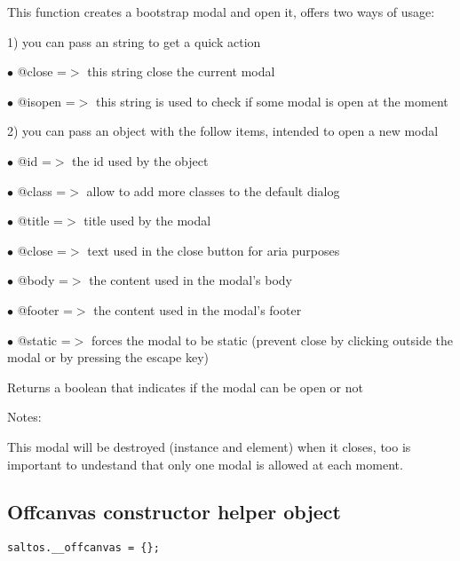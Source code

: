\documentclass[a4paper]{book}
\begin{document}
This function creates a bootstrap modal and open it, offers two ways of usage:

1) you can pass an string to get a quick action

\begin{compactitem}
\item[\color{myblue}$\bullet$] @close  =$>$ this string close the current modal
\item[\color{myblue}$\bullet$] @isopen =$>$ this string is used to check if some modal is open at the moment
\end{compactitem}

2) you can pass an object with the follow items, intended to open a new modal

\begin{compactitem}
\item[\color{myblue}$\bullet$] @id     =$>$ the id used by the object
\item[\color{myblue}$\bullet$] @class  =$>$ allow to add more classes to the default dialog
\item[\color{myblue}$\bullet$] @title  =$>$ title used by the modal
\item[\color{myblue}$\bullet$] @close  =$>$ text used in the close button for aria purposes
\item[\color{myblue}$\bullet$] @body   =$>$ the content used in the modal's body
\item[\color{myblue}$\bullet$] @footer =$>$ the content used in the modal's footer
\item[\color{myblue}$\bullet$] @static =$>$ forces the modal to be static (prevent close by clicking outside the modal or
           by pressing the escape key)
\end{compactitem}

Returns a boolean that indicates if the modal can be open or not

Notes:

This modal will be destroyed (instance and element) when it closes, too is important
to undestand that only one modal is allowed at each moment.

\hypertarget{toc414}{}
\subsection{Offcanvas constructor helper object}

\begin{lstlisting}
saltos.__offcanvas = {};
\end{lstlisting}
\end{document}
